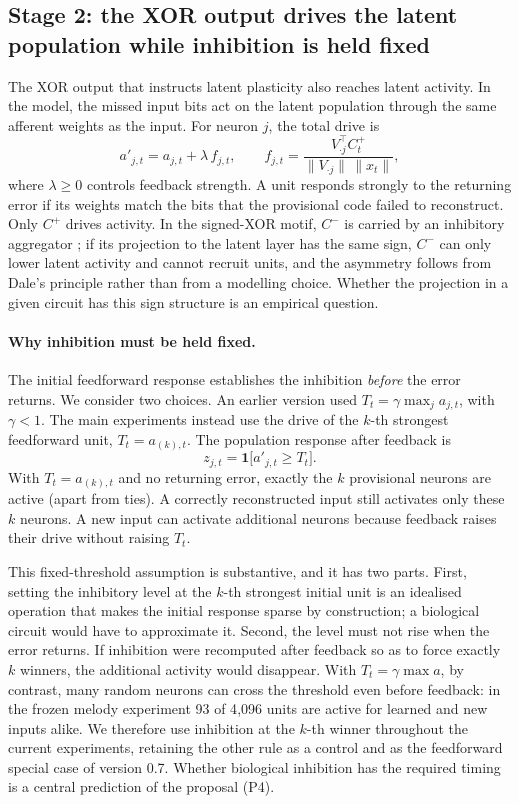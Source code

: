 \documentclass[11pt,a4paper]{article}
\begin{document}
\subsection{Stage 2: the XOR output drives the latent population while inhibition is held fixed}
The XOR output that instructs latent plasticity also reaches latent activity. In the model, the missed input bits act on the latent population through the same afferent weights as the input. For neuron $j$, the total drive is
\begin{equation}
 a'_{j,t}=a_{j,t}+\lambda\,f_{j,t},\qquad f_{j,t}=\frac{V_{\cdot j}^{\top}C^+_t}{\|V_{\cdot j}\|\,\|x_t\|},
 \label{eq:feedback}
\end{equation}
where $\lambda\ge0$ controls feedback strength. A unit responds strongly to the returning error if its weights match the bits that the provisional code failed to reconstruct. Only $C^+$ drives activity. In the signed-XOR motif, $C^-$ is carried by an inhibitory aggregator \citep{pena2026motif}; if its projection to the latent layer has the same sign, $C^-$ can only lower latent activity and cannot recruit units, and the asymmetry follows from Dale's principle rather than from a modelling choice. Whether the projection in a given circuit has this sign structure is an empirical question.

\paragraph{Why inhibition must be held fixed.}
The initial feedforward response establishes the inhibition \emph{before} the error returns. We consider two choices. An earlier version used $T_t=\gamma\max_j a_{j,t}$, with $\gamma<1$. The main experiments instead use the drive of the $k$-th strongest feedforward unit, $T_t=a_{(k),t}$. The population response after feedback is
\begin{equation}
 z_{j,t}=\mathbf 1\big[a'_{j,t}\ge T_t\big].
 \label{eq:inhib}
\end{equation}
With $T_t=a_{(k),t}$ and no returning error, exactly the $k$ provisional neurons are active (apart from ties). A correctly reconstructed input still activates only these $k$ neurons. A new input can activate additional neurons because feedback raises their drive without raising $T_t$.

This fixed-threshold assumption is substantive, and it has two parts. First, setting the inhibitory level at the $k$-th strongest initial unit is an idealised operation that makes the initial response sparse by construction; a biological circuit would have to approximate it. Second, the level must not rise when the error returns. If inhibition were recomputed after feedback so as to force exactly $k$ winners, the additional activity would disappear. With $T_t=\gamma\max a$, by contrast, many random neurons can cross the threshold even before feedback: in the frozen melody experiment 93 of 4{,}096 units are active for learned and new inputs alike. We therefore use inhibition at the $k$-th winner throughout the current experiments, retaining the other rule as a control and as the feedforward special case of version 0.7. Whether biological inhibition has the required timing is a central prediction of the proposal (P4).
\end{document}

